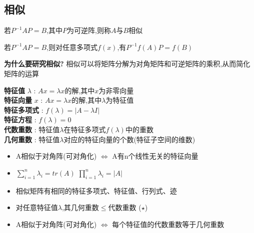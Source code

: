 \subsection{相似}
\begin{tcolorbox}
    [colback=Emerald!10,colframe=cyan!40!black,title=\textbf{相似}]
    若$P^{-1}AP=B$,其中$P$为可逆阵,则称$A$与$B$相似    
\end{tcolorbox}
\begin{tcolorbox}[title=\textbf{矩阵相似的性质},colback=SeaGreen!10!CornflowerBlue!10,colframe=RoyalPurple!55!Aquamarine!100!]
    若$P^{-1}AP=B$,则对任意多项式$f(x)$,有$P^{-1}f(A)P=f(B)$
\end{tcolorbox}
\begin{Chinese Note}
    \textbf{为什么要研究相似?} 相似可以将矩阵分解为对角矩阵和可逆矩阵的乘积,从而简化矩阵的运算
\end{Chinese Note}

\begin{tcolorbox}
    [colback=Emerald!10,colframe=cyan!40!black,title=\textbf{特征值和特征向量}]
    \textbf{特征值} $\lambda$ : $Ax=\lambda x$的解,其中$x$为非零向量\\
    \textbf{特征向量} $x$ : $Ax=\lambda x$的解,其中$\lambda$为特征值\\
    \textbf{特征多项式} : $f(\lambda)=|A-\lambda I|$\\
    \textbf{特征方程} : $f(\lambda)=0$\\
    \textbf{代数重数} : 特征值$\lambda$在特征多项式$f(\lambda)$中的重数\\
    \textbf{几何重数} : 特征值$\lambda$对应的特征向量的个数(特征子空间的维数)
\end{tcolorbox}
\begin{itemize}
    \item A相似于对角阵(可对角化) $\iff$ A有n个线性无关的特征向量
    \item $\sum_{i=1}^{n} \lambda_i = tr(A)$ \qquad $\prod_{i=1}^{n} \lambda_i = |A|$
    \item 相似矩阵有相同的特征多项式、特征值、行列式、迹
    \item 对任意特征值$\lambda$,其几何重数$\leqslant$代数重数 ($\star$)
    \item A相似于对角阵(可对角化) $\iff$ 每个特征值的代数重数等于几何重数
\end{itemize}

